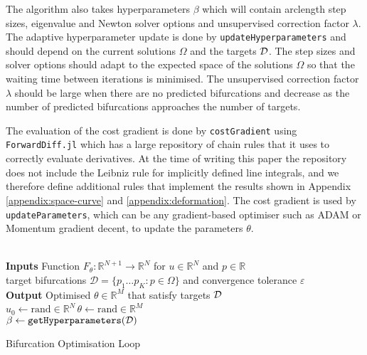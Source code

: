 The algorithm also takes hyperparameters $\beta$ which will contain arclength step sizes, eigenvalue and Newton solver options and unsupervised correction factor $\lambda$. The adaptive hyperparameter update is done by \texttt{updateHyperparameters} and should depend on the current solutions $\Omega$ and the targets $\mathcal{D}$. The step sizes and solver options should adapt to the expected space of the solutions $\Omega$ so that the waiting time between iterations is minimised. The unsupervised correction factor $\lambda$ should be large when there are no predicted bifurcations and decrease as the number of predicted bifurcations approaches the number of targets.

The evaluation of the cost gradient is done by \texttt{costGradient} using \texttt{ForwardDiff.jl} \cite{Revels2016Forward-ModeJulia} which has a large repository of chain rules that it uses to correctly evaluate derivatives. At the time of writing this paper the repository does not include the Leibniz rule \cite{Flanders1973DifferentiationSign} for implicitly defined line integrals, and we therefore define additional rules that implement the results shown in Appendix \ref{appendix:space-curve} and \ref{appendix:deformation}. The cost gradient is used by \texttt{updateParameters}, which can be any gradient-based optimiser such as ADAM or Momentum gradient decent, to update the parameters $\theta$.
\\\\
\begin{algorithm*}[H]
\label{alg:optimisation-loop}
\SetAlgoLined
\textbf{Inputs} Function $F_{\theta}:\mathbb{R}^{N+1}\rightarrow\mathbb{R}^{N}$ for $u\in\mathbb{R}^N$ and $p\in\mathbb{R}$\\ target bifurcations $\mathcal{D}=\{p_1\dots p_K:p\in\Omega\}$ and convergence tolerance $\varepsilon$\\
\textbf{Output} Optimised $\theta\in\mathbb{R}^M$ that satisfy targets $\mathcal{D}$\\
$u_0\leftarrow\mathrm{rand}\in\mathbb{R}^{N}$\quad\,$\theta\leftarrow\mathrm{rand}\in\mathbb{R}^{M}$\\
$\beta\leftarrow\texttt{getHyperparameters}(\mathcal{D})$\\
\caption{Bifurcation Optimisation Loop}
\end{algorithm*}

